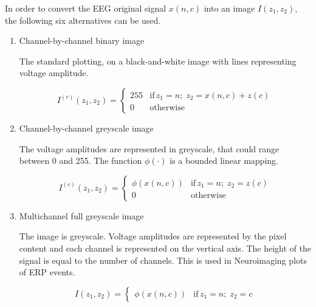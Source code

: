 

In order to convert the EEG original signal $x(n,c)$ into an image $I(z_1,z_2)$, the following six alternatives can be used.

\begin{enumerate}
\item Channel-by-channel binary image

The standard plotting, on a black-and-white image with lines representing voltage amplitude.

\begin{equation}
I^{(c)}(z_1,z_2)= \left\{ \begin{array}{rl}
255 & \text{if} \,  z_1 =  n; \; z_2 = x(n,c) + z(c) \\
0   & \mbox{otherwise}
\end{array}\right.
\label{eq:images}
\end{equation}

\item Channel-by-channel greyscale image

The voltage amplitudes are represented in greyscale, that could range between 0 and 255.  The function $\phi( \cdot )$ is a bounded linear mapping.

\begin{equation}
I^{(c)}(z_1,z_2)= \left\{ \begin{array}{rl}
\phi(x(n,c)) & \text{if} \,  z_1 = n; \; z_2 = z(c) \\
0   & \mbox{otherwise}
\end{array}\right.
\label{eq:images}
\end{equation}

\item Multichannel full greyscale image

The image is greyscale. Voltage amplitudes are represented by the pixel content and each channel is represented on the vertical axis.  The height of the signal is equal to the number of channels.   This is used in Neuroimaging plots of ERP events.

\begin{equation}
I(z_1,z_2) = \left\{ \begin{array}{rl} \phi(x(n,c))  & \text{if} \,  z_1 = n; \; z_2 = c \end{array}\right.
\label{eq:images}
\end{equation}



\end{enumerate}
